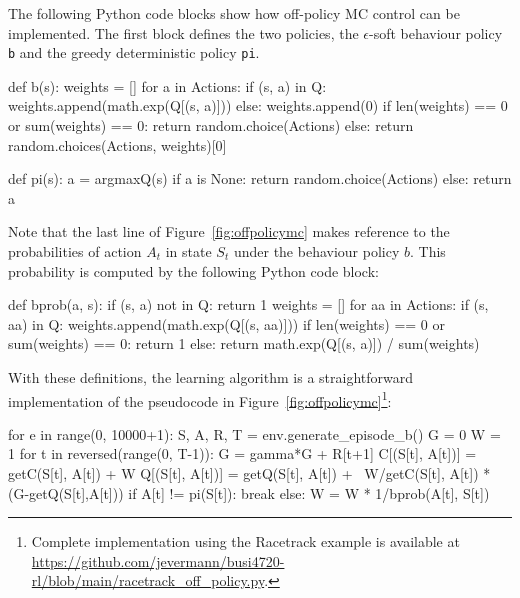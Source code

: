 \begin{withcode}
The following Python code blocks show how off-policy MC control can be implemented. The first block defines the two policies, the $\epsilon$-soft behaviour policy \texttt{b} and the greedy deterministic policy \texttt{pi}.

\begin{pythoncode}
def b(s):
    weights = []
    for a in Actions:
        if (s, a) in Q:
            weights.append(math.exp(Q[(s, a)]))
        else:
            weights.append(0)
    if len(weights) == 0 or sum(weights) == 0:
        return random.choice(Actions)
    else:
        return random.choices(Actions, weights)[0]

def pi(s):
    a = argmaxQ(s)
    if a is None:
        return random.choice(Actions)
    else:
        return a
\end{pythoncode}

Note that the last line of Figure~\ref{fig:offpolicymc} makes reference to the probabilities of action $A_t$ in state $S_t$ under the behaviour policy $b$. This probability is computed by the following Python code block:

\begin{pythoncode}
def bprob(a, s):
    if (s, a) not in Q:
        return 1
    weights = []
    for aa in Actions:
        if (s, aa) in Q:
            weights.append(math.exp(Q[(s, aa)]))
    if len(weights) == 0 or sum(weights) == 0:
        return 1
    else:
        return math.exp(Q[(s, a)]) / sum(weights)
\end{pythoncode}

With these definitions, the learning algorithm is a straightforward implementation of the pseudocode in Figure~\ref{fig:offpolicymc}\footnote{Complete implementation using the Racetrack example is available at \url{https://github.com/jevermann/busi4720-rl/blob/main/racetrack_off_policy.py}.}:

\begin{pythoncode}
for e in range(0, 10000+1):
    S, A, R, T = env.generate_episode_b()
    G = 0
    W = 1
    for t in reversed(range(0, T-1)):
        G = gamma*G + R[t+1]
        C[(S[t], A[t])] = getC(S[t], A[t]) + W
        Q[(S[t], A[t])] = getQ(S[t], A[t]) + \
               W/getC(S[t], A[t]) * (G-getQ(S[t],A[t]))
        if A[t] != pi(S[t]):
            break
        else:
            W = W * 1/bprob(A[t], S[t])
\end{pythoncode}
\end{withcode}

